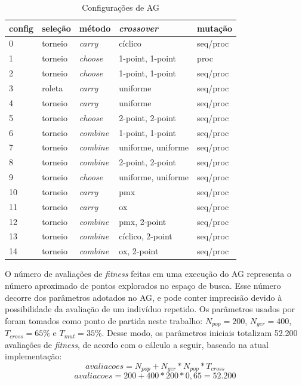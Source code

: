 \documentclass[fleqn,10pt]{SelfArx} %
\begin{document}
\begin{table}[h]
\footnotesize
\centering
\caption{Configurações de AG}
\begin{tabular}{|l|l|l|l|l|}
\hline
\textbf{config} & \textbf{seleção}  & \textbf{método}  & \textbf{\textit{crossover}}       & \textbf{mutação}  \\ \hline
0      & torneio  & \textit{carry}   & cíclico            & seq/proc \\ \hline
1      & torneio  & \textit{choose}  & 1-point, 1-point   & proc     \\ \hline
2      & torneio  & \textit{choose}  & 1-point, 1-point   & seq/proc \\ \hline
3      & roleta   & \textit{carry}   & uniforme           & seq/proc \\ \hline
4      & torneio  & \textit{carry}   & uniforme           & seq/proc \\ \hline
5      & torneio  & \textit{choose}  & 2-point, 2-point   & seq/proc \\ \hline
6      & torneio  & \textit{combine} & 1-point, 1-point   & seq/proc \\ \hline
7      & torneio  & \textit{combine} & uniforme, uniforme & seq/proc \\ \hline
8      & torneio  & \textit{combine} & 2-point, 2-point   & seq/proc \\ \hline
9      & torneio  & \textit{choose}  & uniforme, uniforme & seq/proc \\ \hline
10     & torneio  & \textit{carry}   & pmx                & seq/proc \\ \hline
11     & torneio  & \textit{carry}   & ox                 & seq/proc \\ \hline
12     & torneio  & \textit{combine} & pmx, 2-point       & seq/proc \\ \hline
13     & torneio  & \textit{combine} & cíclico, 2-point   & seq/proc \\ \hline
14     & torneio  & \textit{combine} & ox, 2-point        & seq/proc \\ \hline
\end{tabular}
\label{tab:configs}
\end{table}

O número de avaliações de \textit{fitness} feitas em uma execução do AG representa o número aproximado de pontos explorados no espaço de busca. Esse número decorre dos parâmetros adotados no AG, e pode conter imprecisão devido à possibilidade da avaliação de um indivíduo repetido. Os parâmetros usados por \citeauthor{Morady} foram tomados como ponto de partida neste trabalho: $N_{pop} = 200$, $N_{ger} = 400$, $T_{cross} = 65\%$ e $T_{mut} = 35\%$. Desse modo, os parâmetros iniciais totalizam 52.200 avaliações de \textit{fitness}, de acordo com o cálculo a seguir, baseado na atual implementação:
\[avaliacoes = N_{pop} + N_{ger} * N_{pop} * T_{cross}\]
\[ avaliacoes = 200 + 400 * 200 * 0,65 = 52.200\]
\end{document}
